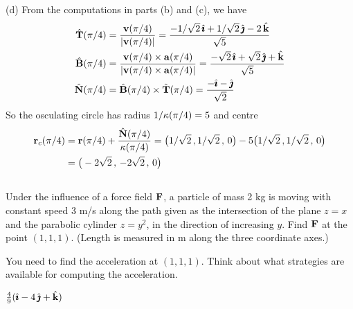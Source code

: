 \begin{solution}
(d) From the computations in parts (b) and (c), we have
\begin{align*}
\hat{\mathbf{T}}(\pi/4)&=\frac{\mathbf{v}(\pi/4)}{|\mathbf{v}(\pi/4)|}
        =\frac{-1/\sqrt{2}\,\hat{\pmb{\imath}} + 1/\sqrt{2}\,\hat{\pmb{\jmath}} -2\,\hat{\mathbf{k}}}{\sqrt{5}}\\
\hat{\mathbf{B}}(\pi/4)&=\frac{\mathbf{v}(\pi/4)\times\mathbf{a}(\pi/4)}{|\mathbf{v}(\pi/4)\times\mathbf{a}(\pi/4)|}
       =\frac{-\sqrt{2}\,\hat{\pmb{\imath}} +\sqrt{2}\,\hat{\pmb{\jmath}} + \hat{\mathbf{k}}}{\sqrt{5}}\\
\hat{\mathbf{N}}(\pi/4)&=\hat{\mathbf{B}}(\pi/4)\times\hat{\mathbf{T}}(\pi/4)
       =\frac{-\hat{\pmb{\imath}}-\hat{\pmb{\jmath}}}{\sqrt{2}}
\end{align*}
So the osculating circle has radius $1/\kappa(\pi/4)=5$ and centre
\begin{align*}
\mathbf{r}_c(\pi/4)&=\mathbf{r}(\pi/4)+\frac{\hat{\mathbf{N}}(\pi/4)}{\kappa(\pi/4)}
                 =\big(1/\sqrt{2}\,,1/\sqrt{2}\,,\,0\big)
                   -5\big(1/\sqrt{2}\,,1/\sqrt{2}\,,\,0\big) \\
            &=\big(-2\sqrt{2}\,,\,-2\sqrt{2}\,,\,0\big)
\end{align*}
\end{solution}




\subsection*{\Application}


\begin{question}[M317 2008D] %
Under the influence of a force field $\mathbf{F}$, a particle of mass 2 kg is 
moving with constant speed 3 m/s along the path given as the 
intersection of the plane $z = x$ and the parabolic cylinder $z = y^2$, 
in the direction of increasing $y$. Find $\mathbf{F}$  at the point
$(1, 1, 1)$. (Length is measured in m along the three coordinate axes.)
\end{question}

\begin{hint} 
You need to find the acceleration at $(1,1,1)$. Think about 
what strategies are available for computing the acceleration.
\end{hint}

\begin{answer} 
$\frac{4}{9}(\hat{\pmb{\imath}}-4\,\hat{\pmb{\jmath}}+\hat{\mathbf{k}})$
\end{answer}

